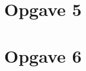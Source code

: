\documentclass[../main.tex]{subfiles}
\begin{document}
\section{Opgave 5}




\section{Opgave 6}
\end{document}
